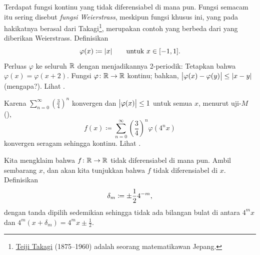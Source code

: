 \begin{example}
Terdapat fungsi kontinu yang tidak diferensiabel di mana pun.
Fungsi semacam itu sering disebut
\emph{fungsi Weierstrass},
meskipun fungsi
khusus ini, yang pada hakikatnya berasal dari
Takagi\footnote{\href{https://en.wikipedia.org/wiki/Teiji_Takagi}{Teiji
Takagi} (1875--1960) adalah seorang matematikawan Jepang.}, merupakan contoh yang berbeda dari yang diberikan Weierstrass.
Definisikan
\begin{equation*}
\varphi(x) \coloneqq \lvert {x} \rvert \qquad \text{untuk } x \in [-1,1] .
\end{equation*}
Perluas $\varphi$ ke seluruh ${\mathbb{R}}$ dengan menjadikannya
2-periodik:
Tetapkan bahwa
$\varphi(x) = \varphi(x+2)$.  Fungsi $\varphi \colon {\mathbb{R}} \to {\mathbb{R}}$
kontinu; bahkan, $\bigl\lvert {\varphi(x)-\varphi(y)} \bigr\rvert \leq \lvert {x-y} \rvert$ (mengapa?).
Lihat .
\begin{myfigureht}
\caption{Fungsi 2-periodik $\varphi$.\label{fig:triangwave}}
\end{myfigureht}

Karena $\sum_{n=0}^\infty {\left(\frac{3}{4}\right)}^n$ konvergen dan $\bigl\lvert {\varphi(x)} \bigr\rvert \leq
1$ untuk semua $x$, menurut uji-$M$
(),
\begin{equation*}
f(x) \coloneqq \sum_{n=0}^\infty 
{\left(\frac{3}{4}\right)}^n \varphi(4^n x)
\end{equation*}
konvergen seragam sehingga kontinu.
Lihat .

\begin{myfigureht}
\caption{Grafik fungsi $f$ yang tidak diferensiabel di mana pun.\label{fig:nowherediff}}
\end{myfigureht}

Kita mengklaim bahwa $f \colon
{\mathbb{R}} \to {\mathbb{R}}$ tidak diferensiabel di mana pun.
Ambil sembarang $x$, dan akan kita tunjukkan bahwa $f$ tidak diferensiabel di $x$.
Definisikan
\begin{equation*}
\delta_m \coloneqq \pm \frac{1}{2} 4^{-m} ,
\avoidbreak
\end{equation*}
dengan tanda dipilih sedemikian sehingga tidak ada bilangan bulat
di antara $4^m x$ dan $4^m(x+\delta_m) = 4^m x \pm \frac{1}{2}$.


\end{example}
